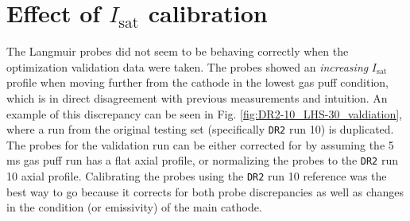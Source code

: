 \section{Effect of $I_\text{sat}$ calibration \label{app:calib}}


The Langmuir probes did not seem to be behaving correctly when the optimization validation data were taken. The probes showed an \emph{increasing} $I_\text{sat}$ profile when moving further from the cathode in the lowest gas puff condition, which is in direct disagreement with previous measurements and intuition. An example of this discrepancy can be seen in Fig. \ref{fig:DR2-10_LHS-30_valdiation}, where a run from the original testing set (specifically \texttt{DR2} run 10) is duplicated. The probes for the validation run can be either corrected for by assuming the 5 ms gas puff run has a flat axial profile, or normalizing the probes to the \texttt{DR2} run 10 axial profile. Calibrating the probes using the \texttt{DR2} run 10 reference was the best way to go because it corrects for both probe discrepancies as well as changes in the condition (or emissivity) of the main cathode. 